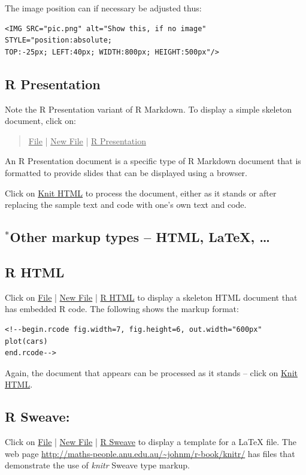 \documentclass{tufte-book}\usepackage[]{graphicx}\usepackage[]{color}
\begin{document}
The image position can if necessary be adjusted thus:
\begin{verbatim}
<IMG SRC="pic.png" alt="Show this, if no image" STYLE="position:absolute;
TOP:-25px; LEFT:40px; WIDTH:800px; HEIGHT:500px"/>
\end{verbatim}

\subsection*{R Presentation}

Note the R Presentation variant of R Markdown.
To display a simple skeleton  document, click on:
\begin{quote}
\underline{File} | \underline{New File} | \underline{R Presentation}
\end{quote}
An R Presentation document is a specific type of R Markdown document
that is formatted to provide slides that can be displayed using a
browser.

Click on \underline{Knit HTML} to process the document, either as it
stands or after replacing the sample text and code with one's own text
and code.

\subsection{$^*$Other markup types -- HTML,  LaTeX, \ldots}

\subsection*{R HTML}

Click on \underline{File} | \underline{New File} | \underline{R HTML}
to display a skeleton HTML document that has embedded R code.
The following shows the markup format:
\begin{verbatim}
<!--begin.rcode fig.width=7, fig.height=6, out.width="600px"
plot(cars)
end.rcode-->
\end{verbatim}

Again, the document that appears can be processed as it stands --
click on \underline{Knit HTML}.

\subsection*{R Sweave: }

Click on \underline{File} | \underline{New
  File} | \underline{R Sweave} to display a template for a LaTeX file.
The web page \url{http://maths-people.anu.edu.au/~johnm/r-book/knitr/} has
files that demonstrate the use of {\em knitr} Sweave type markup.
\end{document}
